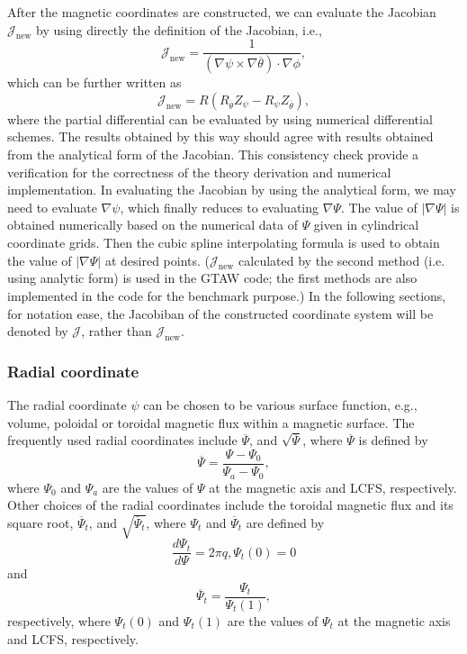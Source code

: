 \documentclass{article}
\newcommand{\tmop}[1]{\ensuremath{\operatorname{#1}}}
\begin{document}
After the magnetic coordinates are constructed, we can evaluate the Jacobian
$\mathcal{J}_{\tmop{new}}$ by using directly the definition of the Jacobian,
i.e.,
\[ \mathcal{J}_{\tmop{new}} = \frac{1}{(\nabla \psi \times \nabla
   \overline{\theta}) \cdot \nabla \phi}, \]
which can be further written as
\begin{equation}
  \mathcal{J}_{\tmop{new}} = R (R_{\overline{\theta}} Z_{\psi} - R_{\psi}
  Z_{\overline{\theta}}),
\end{equation}
where the partial differential can be evaluated by using numerical
differential schemes. The results obtained by this way should agree with
results obtained from the analytical form of the Jacobian. This consistency
check provide a verification for the correctness of the theory derivation and
numerical implementation. In evaluating the Jacobian by using the analytical
form, we may need to evaluate $\nabla \psi$, which finally reduces to
evaluating $\nabla \Psi$. The value of $| \nabla \Psi |$ is obtained
numerically based on the numerical data of $\Psi$ given in cylindrical
coordinate grids. Then the cubic spline interpolating formula is used to
obtain the value of $| \nabla \Psi |$ at desired points.
($\mathcal{J}_{\tmop{new}}$ calculated by the second method (i.e. using
analytic form) is used in the GTAW code; the first methods are also
implemented in the code for the benchmark purpose.) In the following sections,
for notation ease, the Jacobiban of the constructed coordinate system will be
denoted by $\mathcal{J}$, rather than $\mathcal{J}_{\tmop{new}}$.

\subsubsection{\label{9-27-1}Radial coordinate}

The radial coordinate $\psi$ can be chosen to be various surface function,
e.g., volume, poloidal or toroidal magnetic flux within a magnetic surface.
The frequently used radial coordinates include $\overline{\Psi}$, and
$\sqrt{\overline{\Psi}}$, where $\overline{\Psi}$ is defined by
\begin{equation}
  \label{19-4-11-3} \overline{\Psi} = \frac{\Psi - \Psi_0}{\Psi_a - \Psi_0},
\end{equation}
where $\Psi_0$ and $\Psi_a$ are the values of $\Psi$ at the magnetic axis and
LCFS, respectively. Other choices of the radial coordinates include the
toroidal magnetic flux and its square root, $\overline{\Psi}_t$, and
$\sqrt{\overline{\Psi}_t}$, where $\Psi_t$ and $\overline{\Psi}_t$ are defined
by
\begin{equation}
  \frac{d \Psi_t}{d \Psi} = 2 \pi q, \Psi_t (0) = 0
\end{equation}
and
\begin{equation}
  \overline{\Psi}_t = \frac{\Psi_t}{\Psi_t (1)},
\end{equation}
respectively, where $\Psi_t (0)$ and $\Psi_t (1)$ are the values of $\Psi_t$
at the magnetic axis and LCFS, respectively.
\end{document}
